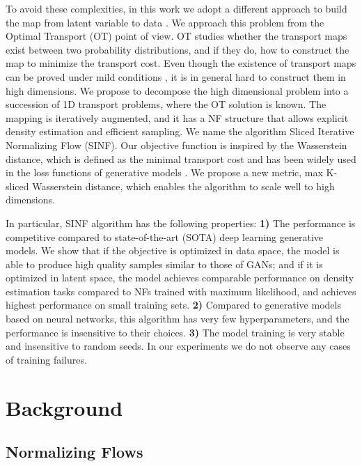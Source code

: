 \documentclass{article}
\begin{document}
To avoid these complexities, in this work we adopt a different approach to build the map from latent variable  to data . We approach this problem from the Optimal Transport (OT) point of view. OT studies whether the transport maps exist between two probability distributions, and if they do, how to construct the map to minimize the transport cost. Even though the existence of transport maps can be proved under mild conditions \citep{villani2008optimal}, it is in general hard to construct them in high dimensions. We propose to decompose the high dimensional problem into a succession of 1D transport problems, where the OT solution is known. The mapping is iteratively augmented, and it has a NF structure that allows explicit density estimation and efficient sampling. We name the algorithm Sliced Iterative Normalizing Flow (SINF). Our objective function is inspired by the Wasserstein distance, which is defined as the minimal transport cost and has been widely used in the loss functions of generative models \citep{arjovsky2017towards, tolstikhin2017wasserstein}. We propose a new metric, max K-sliced Wasserstein distance, which enables the algorithm to scale well to high dimensions. 

In particular, SINF algorithm has the following properties: \newline
    \textbf{1)} The performance is competitive compared to state-of-the-art (SOTA) deep learning generative models. We show that if the objective is optimized in data space, the model is able to produce high quality samples similar to those of GANs; and if it is optimized in latent space, the model achieves comparable performance on density estimation tasks compared to NFs trained with maximum likelihood, and achieves highest performance on small training sets.\newline
    \textbf{2)} Compared to generative models based on neural networks, this algorithm has very few hyperparameters, and the performance is insensitive to their choices. \newline
    \textbf{3)} The model training is very stable and insensitive to random seeds. In our experiments we do not observe any cases of training failures. \newline 


\section{Background}

\subsection{Normalizing Flows}
\end{document}
